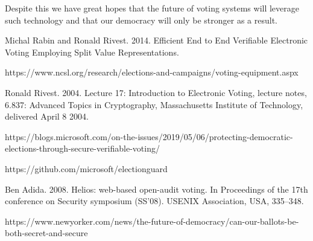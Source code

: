 \documentclass{article}
\begin{document}
Despite this we have great hopes that the future of voting systems will leverage such technology and that our democracy will only be stronger as a result.

\begin{thebibliography}{7}

Michal Rabin and Ronald Rivest. 2014. Efficient End to End Verifiable Electronic Voting Employing Split Value Representations.

https://www.ncsl.org/research/elections-and-campaigns/voting-equipment.aspx

Ronald Rivest. 2004. Lecture 17: Introduction to Electronic Voting, lecture notes, 6.837: Advanced Topics in Cryptography, Massachusetts Institute of Technology, delivered April 8 2004.

https://blogs.microsoft.com/on-the-issues/2019/05/06/protecting-democratic-elections-through-secure-verifiable-voting/

https://github.com/microsoft/electionguard

Ben Adida. 2008. Helios: web-based open-audit voting. In Proceedings of the 17th conference on Security symposium (SS'08). USENIX Association, USA, 335–348.

https://www.newyorker.com/news/the-future-of-democracy/can-our-ballots-be-both-secret-and-secure


\end{thebibliography}
\end{document}
